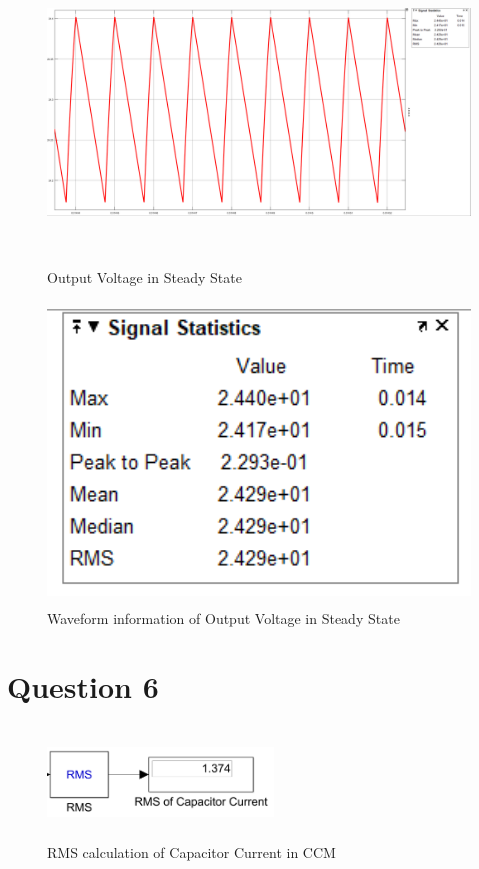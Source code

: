 \documentclass[oneside,12pt]{article}
\begin{document}
\begin{figure}[H]
	\centering
	\includegraphics[width=14cm, height=8cm]{"q5/peak to peak output voltage"}
	\caption{Output Voltage in Steady State}
	\label{fig:peak-to-peak-output-voltage}
\end{figure}

\begin{figure}[H]
	\centering
	\includegraphics[width=14cm, height=8cm]{q5/statistics}
	\caption{Waveform information of Output Voltage in Steady State}
	\label{fig:statistics}
\end{figure}


\newpage\section{Question 6}



\begin{figure}[H]
	\centering
	\includegraphics[width=6cm, height=3cm]{"q6/rmscalc"}
	\caption{RMS calculation of Capacitor Current in CCM }
	\label{fig:ekran-alnts}
\end{figure}
\end{document}
